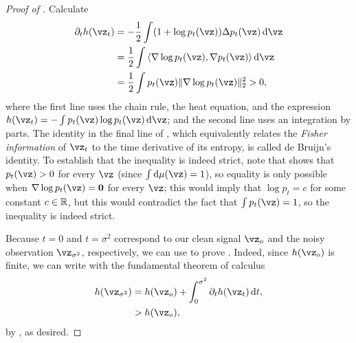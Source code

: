 \documentclass[../../book-main.tex]{subfiles}
\begin{document}
\begin{proof}[Proof of {}]
  Calculate
  \begin{equation}\label{eq:de-bruijn}
    \begin{split}
      \partial_t h(\vz_t)
      &=
      -\frac{1}{2} \int (1 + \log p_t(\vz)) \Delta p_t(\vz) \odif{\vz}
      \\
      &=
      \frac{1}{2} \int \ip*{\nabla \log p_t(\vz)}{\nabla p_t(\vz)} \odif{\vz}
      \\
      &= \frac{1}{2} \int p_t(\vz) \norm{\nabla \log p_t(\vz)}_2^2
      > 0,
    \end{split}
  \end{equation}
  where the first line uses the chain rule, the heat equation, and the expression
  $h(\vz_t) = -\int p_t(\vz) \log p_t(\vz) \odif{\vz}$; and the second line uses an integration by parts.
  The identity in the final line of , which equivalently
  relates the \textit{Fisher information} of $\vz_t$ to the time derivative of its
  entropy, is called de Bruijn's identity. 
  To establish that the inequality is indeed strict, note that
   shows that $p_t(\vz) > 0$
  for every $\vz$ (since $\int \odif \mu(\vz) = 1$), so equality is only
  possible when $\nabla \log p_t(\vz) = \mathbf{0}$ for every $\vz$; this would
  imply that $\log p_t = c$ for some constant $c \in \mathbb{R}$, but this would
  contradict the fact that $\int p_t(\vz) = 1$, so the inequality is indeed
  strict.

  Because $t=0$ and $t=\sigma^2$ correspond to our clean signal $\vz_o$ and the
  noisy observation $\vz_{\sigma^2}$, respectively,
  we can use  to prove . 
  Indeed, since $h(\vz_o)$ is finite, we can write with the fundamental theorem
  of calculus
  \begin{equation}\label{eq:de-bruijn-ftc}
    \begin{split}
    h(\vz_{\sigma^2}) &= h(\vz_o) + \int_0^{\sigma^2} \partial_t h(\vz_t) \odif t,
    \\
    &> h(\vz_o),
    \end{split}
  \end{equation}
  by , as desired.



\end{proof}
\end{document}
